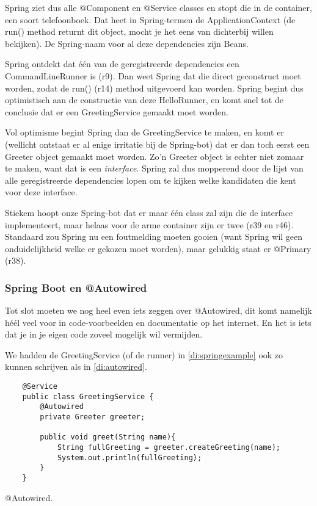 Spring ziet dus alle @Component en @Service classes en stopt die in de container, een soort telefoonboek. 
Dat heet in Spring-termen de ApplicationContext (de run() method returnt dit object, mocht je het eens van 
dichterbij willen bekijken). De Spring-naam voor al deze dependencies zijn Beans.

Spring ontdekt dat één van de geregistreerde dependencies een CommandLineRunner is (r9). Dan weet Spring dat die
direct geconstruct moet worden, zodat de run() (r14) method uitgevoerd kan worden. Spring begint dus optimistisch
aan de constructie van deze HelloRunner, en komt snel tot de conclusie dat er een GreetingService gemaakt moet worden.

Vol optimisme begint Spring dan de GreetingService te maken, en komt er (wellicht ontstaat er al enige irritatie
bij de Spring-bot) dat er dan toch eerst een Greeter object gemaakt moet worden. Zo'n Greeter object is echter niet
zomaar te maken, want dat is een \emph{interface}. Spring zal dus mopperend door de lijst van alle geregistreerde 
dependencies lopen om te kijken welke kandidaten die kent voor deze interface.

Stiekem hoopt onze Spring-bot dat er maar één class zal zijn die de interface implementeert, maar helaas voor de
arme container zijn er twee (r39 en r46). Standaard zou Spring nu een foutmelding moeten gooien (want Spring wil
geen onduidelijkheid welke er gekozen moet worden), maar gelukkig staat er @Primary (r38).

\subsubsection*{Spring Boot en @Autowired}

Tot slot moeten we nog heel even iets zeggen over @Autowired, dit komt namelijk héél veel voor in code-voorbeelden
en documentatie op het internet. En het is iets dat je in je eigen code zoveel mogelijk wil vermijden.

We hadden de GreetingService (of de runner) in \ref{di:springexample} ook zo kunnen schrijven als in \ref{di:autowired}.

\begin{listing}[H]
    \begin{verbatim}
    @Service
    public class GreetingService {
        @Autowired
        private Greeter greeter;

        public void greet(String name){
            String fullGreeting = greeter.createGreeting(name);
            System.out.println(fullGreeting);
        }
    }
    \end{verbatim}
    \caption{@Autowired.}
    \label{di:autowired}
\end{listing}

